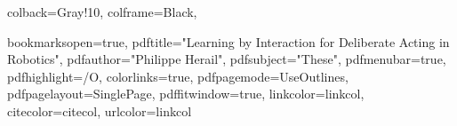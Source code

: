 {  %
  colback=Gray!10,
  colframe={Black},
}







\hypersetup
{
  bookmarksopen=true,
  pdftitle="Learning by Interaction for Deliberate Acting in Robotics",
  pdfauthor="Philippe Herail", %
  pdfsubject="These", %
  pdfmenubar=true, %
  pdfhighlight=/O, %
  colorlinks=true, %
  pdfpagemode=UseOutlines, %
  pdfpagelayout=SinglePage, %
  pdffitwindow=true, %
  linkcolor=linkcol, %
  citecolor=citecol, %
  urlcolor=linkcol %
}

